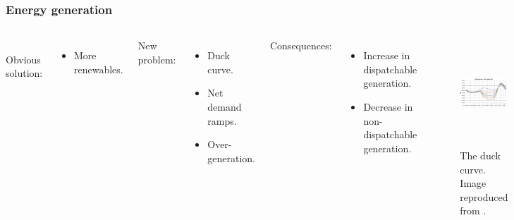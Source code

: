 \begin{frame}
\frametitle{Energy generation}
\begin{columns}
	\column[t]{4cm}
	\\
	Obvious solution:
	\begin{itemize}
		\item More renewables.
	\end{itemize}

    New problem:
	\begin{itemize}
		\item Duck curve.
		\item Net demand ramps.
		\item Over-generation.
	\end{itemize}

    Consequences:
	\begin{itemize}
		\item Increase in dispatchable generation.
		\item Decrease in non-dispatchable generation.
	\end{itemize}

    \column[t]{6cm}
	\begin{figure}[htbp!]
		\begin{center}
			\includegraphics[height=4.0cm]{images/caiso-duck.png}
		\end{center}
		\caption{The duck curve. Image reproduced from \cite{bouillon_prepared_2014}.}
	\end{figure}
\end{columns}
\end{frame}


